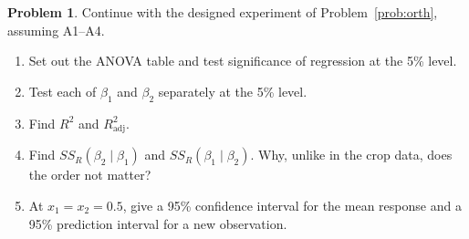 \documentclass[11pt,a4paper]{article}
\numberwithin{equation}{section}
\theoremstyle{definition}
\newtheorem{problemx}{Problem}[subsection]
\newenvironment{problem}{\begin{problemx}}{\end{problemx}}
\begin{document}
\begin{problem}\label{prob:orth-inference}
Continue with the designed experiment of Problem~\ref{prob:orth}, assuming A1--A4.
\begin{enumerate}[label=(\alph*)]
\item Set out the ANOVA table and test significance of regression at the 5\% level.
\item Test each of $\beta_1$ and $\beta_2$ separately at the 5\% level.
\item Find $R^2$ and $R^2_{\mathrm{adj}}$.
\item Find $SS_R(\beta_2 \mid \beta_1)$ and $SS_R(\beta_1 \mid \beta_2)$. Why, unlike in the crop
data, does the order not matter?
\item At $x_1 = x_2 = 0.5$, give a 95\% confidence interval for the mean response and a 95\%
prediction interval for a new observation.
\end{enumerate}
\end{problem}
\end{document}
